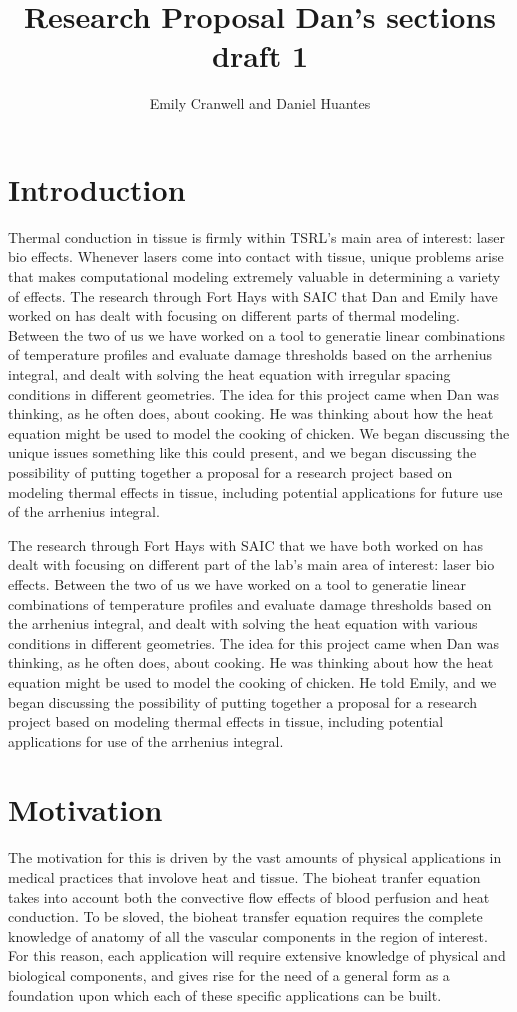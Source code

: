 \documentclass[12pt]{article}
\begin{document}
\title{Research Proposal
\large Dan's sections draft 1}
\author{Emily Cranwell and Daniel Huantes}
\maketitle
\section{Introduction}
Thermal conduction in tissue is firmly within TSRL's main area of interest: laser bio effects. Whenever lasers come into contact with tissue, unique problems arise that makes computational modeling extremely valuable in determining a variety of effects. The research through Fort Hays with SAIC that Dan and Emily have worked on has dealt with focusing on different parts of thermal modeling. Between the two of us we have worked on a tool to generatie linear combinations of temperature profiles and evaluate damage thresholds based on the arrhenius integral, and dealt with solving the heat equation with irregular spacing conditions in different geometries. The idea for this project came when Dan was thinking, as he often does, about cooking. He was thinking about how the heat equation might be used to model the cooking of chicken. We began discussing the unique issues something like this could present, and we began discussing the possibility of putting together a proposal for a research project based on modeling thermal effects in tissue, including potential applications for future use of the arrhenius integral.

The research through Fort Hays with SAIC that we have both worked on has dealt with focusing on different part of the lab's main area of interest: laser bio effects. Between the two of us  we have worked on a tool to generatie linear combinations of temperature profiles and evaluate damage thresholds based on the arrhenius integral, and dealt with solving the heat equation with various conditions in different geometries. The idea for this project came when Dan was thinking, as he often does, about cooking. He was thinking about how the heat equation might be used to model the cooking of chicken. He told Emily, and we began discussing the possibility of putting together a proposal for a research project based on modeling thermal effects in tissue, including potential applications for use of the arrhenius integral.

\section{Motivation}
\indent The motivation for this is driven by the vast amounts of physical applications in medical practices that involove heat and tissue. The bioheat tranfer equation takes into account both the convective flow effects of blood perfusion and heat conduction. To be sloved, the bioheat transfer equation requires the complete knowledge of anatomy of all the vascular components in the region of interest. For this reason, each application will require extensive knowledge of physical and biological components, and gives rise for the need of a general form as a foundation upon which each of these specific applications can be built. 
\end{document}
